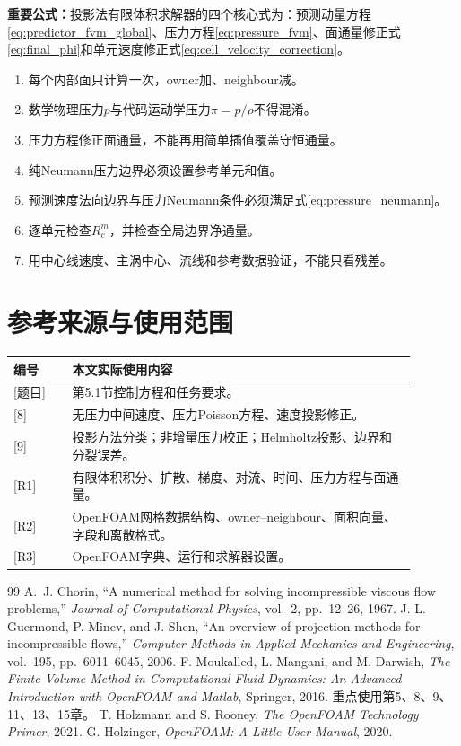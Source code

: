 \documentclass[UTF8,12pt,a4paper]{ctexart}
\numberwithin{equation}{section}
\newcommand{\Task}{\textnormal{[题目]}}
\newcommand{\Chorin}{\textnormal{[8]}}
\newcommand{\Guermond}{\textnormal{[9]}}
\newcommand{\Rone}{\textnormal{[R1]}}
\newcommand{\Rtwo}{\textnormal{[R2]}}
\newcommand{\Rthree}{\textnormal{[R3]}}
\newcommand{\keytitle}[1]{\par\smallskip\noindent\colorbox{keybg}{%
  \parbox{0.965\linewidth}{\color{keyblue}\textbf{重要公式：}#1}}\par\smallskip}
\begin{document}
\keytitle{投影法有限体积求解器的四个核心式为：预测动量方程\eqref{eq:predictor_fvm_global}、压力方程\eqref{eq:pressure_fvm}、面通量修正式\eqref{eq:final_phi}和单元速度修正式\eqref{eq:cell_velocity_correction}。}

\begin{enumerate}
  \item 每个内部面只计算一次，owner加、neighbour减。
  \item 数学物理压力$p$与代码运动学压力$\pi=p/\rho$不得混淆。
  \item 压力方程修正面通量，不能再用简单插值覆盖守恒通量。
  \item 纯Neumann压力边界必须设置参考单元和值。
  \item 预测速度法向边界与压力Neumann条件必须满足式\eqref{eq:pressure_neumann}。
  \item 逐单元检查$R_c^m$，并检查全局边界净通量。
  \item 用中心线速度、主涡中心、流线和参考数据验证，不能只看残差。
\end{enumerate}

\section{参考来源与使用范围}
\begin{longtable}{p{0.13\linewidth}p{0.76\linewidth}}
\toprule
编号 & 本文实际使用内容\\
\midrule
\Task & 第5.1节控制方程和任务要求。\\
\Chorin & 无压力中间速度、压力Poisson方程、速度投影修正。\\
\Guermond & 投影方法分类；非增量压力校正；Helmholtz投影、边界和分裂误差。\\
\Rone & 有限体积积分、扩散、梯度、对流、时间、压力方程与面通量。\\
\Rtwo & OpenFOAM网格数据结构、owner--neighbour、面积向量、字段和离散格式。\\
\Rthree & OpenFOAM字典、运行和求解器设置。\\
\bottomrule
\end{longtable}

\begin{thebibliography}{99}
A.~J. Chorin,
“A numerical method for solving incompressible viscous flow problems,”
\emph{Journal of Computational Physics}, vol.~2, pp.~12--26, 1967.
J.-L. Guermond, P. Minev, and J. Shen,
“An overview of projection methods for incompressible flows,”
\emph{Computer Methods in Applied Mechanics and Engineering},
vol.~195, pp.~6011--6045, 2006.
F. Moukalled, L. Mangani, and M. Darwish,
\emph{The Finite Volume Method in Computational Fluid Dynamics: An Advanced Introduction with OpenFOAM and Matlab},
Springer, 2016. 重点使用第5、8、9、11、13、15章。
T. Holzmann and S. Rooney, \emph{The OpenFOAM Technology Primer}, 2021.
G. Holzinger, \emph{OpenFOAM: A Little User-Manual}, 2020.
\end{thebibliography}
\end{document}
